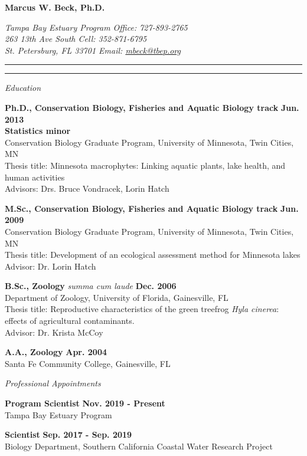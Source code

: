 \documentclass[letterpaper,12pt]{article}
\newcommand{\sectitle}[1]{\vspace{\baselineskip} \centerline{\large{\textit{#1}}}}
\begin{document}
\raggedright

\LARGE
\centerline{{\bf Marcus W. Beck, Ph.D.}}
\normalsize
\textit{Tampa Bay Estuary Program \hfill Office: 727-893-2765 \\
263 13th Ave South \hfill Cell: 352-871-6795 \\
St. Petersburg, FL 33701 \hfill Email: \href{mailto:mbeck@tbep.org}{mbeck@tbep.org}}
\vspace{4pt}
\hrule
\vspace{2pt}
\hrule
\vspace{4pt}

\small

\sectitle{Education}

{\bf Ph.D., Conservation Biology, Fisheries and Aquatic Biology track} \hfill {\bf Jun. 2013} \\
{\bf Statistics minor} \\
Conservation Biology Graduate Program, University of Minnesota, Twin Cities, MN \\
Thesis title: Minnesota macrophytes: Linking aquatic plants, lake health, and human activities \\
Advisors: Drs. Bruce Vondracek, Lorin Hatch

{\bf M.Sc., Conservation Biology, Fisheries and Aquatic Biology track} \hfill {\bf Jun. 2009} \\
Conservation Biology Graduate Program, University of Minnesota, Twin Cities, MN \\
Thesis title: Development of an ecological assessment method for Minnesota lakes\\
Advisor: Dr. Lorin Hatch

{\bf B.Sc., Zoology} \textit{summa cum laude} \hfill {\bf Dec. 2006} \\
Department of Zoology, University of Florida, Gainesville, FL \\
Thesis title: Reproductive characteristics of the green treefrog \textit{Hyla cinerea}: effects of agricultural contaminants. \\
Advisor: Dr. Krista McCoy

{\bf A.A., Zoology} \hfill {\bf Apr. 2004} \\
Santa Fe Community College, Gainesville, FL

\sectitle{Professional Appointments}

{\bf Program Scientist} \hfill {\bf Nov. 2019 - Present}\\
Tampa Bay Estuary Program

{\bf Scientist} \hfill {\bf Sep. 2017 - Sep. 2019}\\
Biology Department, Southern California Coastal Water Research Project
\end{document}

